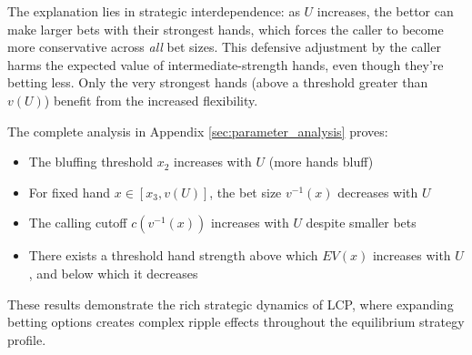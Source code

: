\documentclass[../../main/main.tex]{subfiles}
\begin{document}
The explanation lies in strategic interdependence: as $U$ increases, the bettor can make larger bets with their strongest hands, which forces the caller to become more conservative across \emph{all} bet sizes. This defensive adjustment by the caller harms the expected value of intermediate-strength hands, even though they're betting less. Only the very strongest hands (above a threshold greater than $v(U)$) benefit from the increased flexibility.

The complete analysis in Appendix \ref{sec:parameter_analysis} proves:
\begin{itemize}
    \item The bluffing threshold $x_2$ increases with $U$ (more hands bluff)
    \item For fixed hand $x \in [x_3, v(U)]$, the bet size $v^{-1}(x)$ decreases with $U$
    \item The calling cutoff $c(v^{-1}(x))$ increases with $U$ despite smaller bets
    \item There exists a threshold hand strength above which $EV(x)$ increases with $U$, and below which it decreases
\end{itemize}

These results demonstrate the rich strategic dynamics of LCP, where expanding betting options creates complex ripple effects throughout the equilibrium strategy profile.
\end{document}
